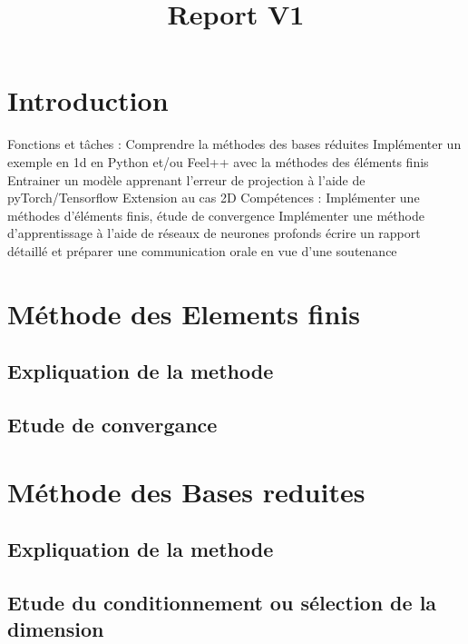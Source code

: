 \documentclass[12pt]{article}
\begin{document}
\title{Report V1}
\author{}
\maketitle



\tableofcontents

\section{Introduction}

Fonctions et tâches :
Comprendre la méthodes des bases réduites
Implémenter un exemple en 1d en Python et/ou Feel++ avec la méthodes des éléments finis
Entrainer un modèle apprenant l'erreur de projection à l'aide de pyTorch/Tensorflow
Extension au cas 2D
Compétences :
Implémenter une méthodes d'éléments finis, étude de convergence
Implémenter une méthode d'apprentissage à l'aide de réseaux de neurones profonds
écrire un rapport détaillé et préparer une communication orale en vue d'une soutenance



\section{Méthode des Elements finis}

\subsection{Expliquation de la methode}


\subsection{Etude de convergance}


\section{Méthode des Bases reduites}

\subsection{Expliquation de la methode}


\subsection{Etude du conditionnement ou sélection de la dimension}
\end{document}
